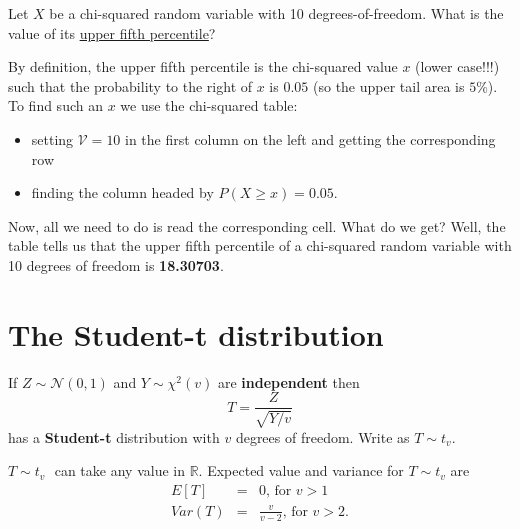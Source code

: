 \documentclass[smaller]{beamer}\usepackage[]{graphicx}\usepackage[]{color}
\newcommand{\N}{\mathcal{N}}
\begin{document}
\begin{frame}{\secname}

\begin{example}
  \begin{footnotesize}
  Let $X$ be a chi-squared random variable with 10 degrees-of-freedom. What is the value of its \underline{upper fifth percentile}? \bigskip

  By definition, the upper fifth percentile is the chi-squared value $x$ (lower case!!!) such that the probability to the right of $x$ is $0.05$ (so the upper tail area is $5\%$).  To find such an $x$ we use the chi-squared table: \medskip
  \begin{itemize}
  \item setting $\mathcal{V} = 10$ in the first column on the left and getting the corresponding row \medskip
  \item finding the column headed by $P(X \geq x) = 0.05$. \medskip
  \end{itemize}

  Now, all we need to do is read the corresponding cell. What do we get? Well, the table tells us that the upper fifth percentile of a chi-squared random variable with 10 degrees of freedom is \textbf{18.30703}.
  \end{footnotesize}
\end{example}
\end{frame}

\section{The Student-t distribution}

\begin{frame}{\secname}
  \begin{definition}
  If $Z\sim \N(0,1)$ and $Y\sim \chi ^{2}(v)$ are \textbf{independent}
  then%
  \begin{equation*}
  T=\frac{Z}{\sqrt{Y/v}}
  \end{equation*}%
  has a \textbf{Student-t} distribution with $v$ degrees of freedom. Write as $T\sim t_{v}$.
  \end{definition}
  \bigskip
  $T\sim t_{v}\,$\ can take any value in $\mathbb{R}$. Expected value and variance for $T\sim t_{v}$ are
  \begin{eqnarray*}
  E\left[ T\right] &=&0\text{, for }v>1 \\
  Var\left( T\right) &=&\frac{v}{v-2}\text{, for }v>2.
  \end{eqnarray*}
\end{frame}
\end{document}

